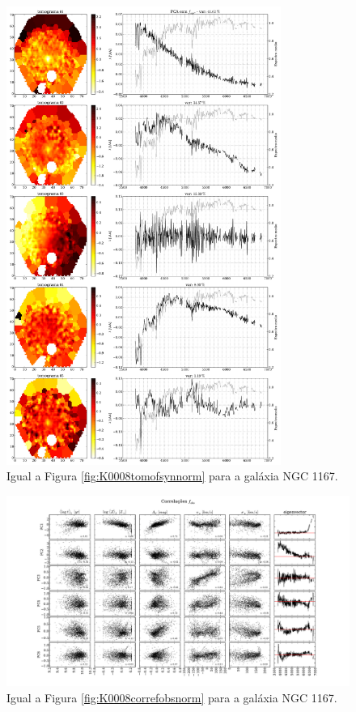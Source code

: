 \begin{figure}
    \includegraphics[width=0.8\textwidth]{figuras/K0119-tomo-syn-norm.pdf}
    \caption[Tomogramas de 1 a 5 para o cubo $f_{syn}$ - NGC 1167.]
    {Igual a Figura \ref{fig:K0008tomofsynnorm} para a galáxia NGC 1167.}
    \label{fig:K0119tomofsynnorm}
\end{figure}

\begin{figure}
    \includegraphics[width=1.2\textwidth, angle=-90]{figuras/K0119-correl-f_obs_norm-PCvsPhys.pdf}
	\caption[Correlações PCs vs. par\^ametros f\'isicos - $f_{obs}$ - NGC 1167.]
	{Igual a Figura \ref{fig:K0008correfobsnorm} para a galáxia NGC 1167.}
    \label{fig:K0119correfobsnorm}
\end{figure}

